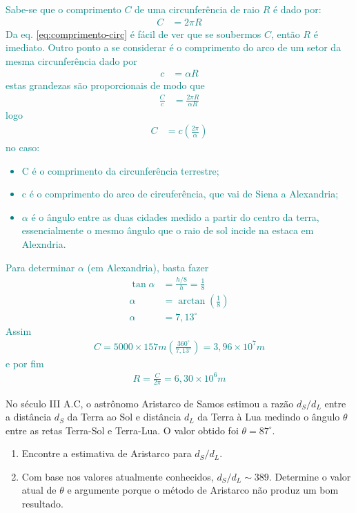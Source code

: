 \begin{sol}
	\textcolor{teal} {
		Sabe-se que o comprimento $C$ de uma circunferência de raio $R$ é dado por:
		\begin{align}
			C&=2\pi R
			\label{eq:comprimento-circ}
		\end{align}
		Da eq. \eqref{eq:comprimento-circ} é fácil de ver que se soubermos $C$, então $R$ é imediato. Outro ponto a se considerar é o comprimento do arco de um setor da mesma circunferência dado por
		\begin{align}
			c&=\alpha R
			\label{eq:comprimento-setor}
		\end{align}
		estas grandezas são proporcionais de modo que
		\begin{align}
			\frac{C}{c}&=\frac{2\pi R}{\alpha R}
		\end{align}
		logo
		\begin{align}
			C&=c\left(\frac{2\pi}{\alpha}\right)
		\end{align}
		no caso:
		\begin{itemize}
			\item C é o comprimento da circunferência terrestre;
			\item c é o comprimento do arco de circuferência, que vai de Siena a Alexandria;
			\item $\alpha$ é o ângulo entre as duas cidades medido a partir do centro da terra, essencialmente o mesmo ângulo que o raio de sol incide na estaca em Alexndria. 
		\end{itemize}
		Para determinar $\alpha$ (em Alexandria), basta fazer
		\begin{align}
			\tan \alpha&=\frac{h/8}{h}=\frac{1}{8} \nonumber \\
			\alpha&=\arctan\left(\frac{1}{8}\right) \nonumber \\
			\alpha&=7,13^{\circ}
		\end{align}
		Assim
		\begin{align}
			C=5000\times 157m\left(\frac{360^{\circ}}{7,13^{\circ}}\right)=3,96\times 10^{7}m
		\end{align}
		e por fim
		\begin{align}
			R=\frac{C}{2\pi}=6,30\times 10^{6}m
		\end{align}
	}
\end{sol}
\begin{prob}[ref: P05]
	No século III A.C, o astrônomo Aristarco de Samos estimou a razão $d_{S}/d_{L}$ entre a distância $d_{S}$ da Terra ao Sol e distância $d_{L}$ da Terra à Lua medindo o ângulo $\theta$ entre as retas Terra-Sol e Terra-Lua. O valor obtido foi $\theta=87^{\circ}$.
	\begin{enumerate}[label=\alph *)]
		\item Encontre a estimativa de Aristarco para $d_{S}/d_{L}$.
		\item Com base nos valores atualmente conhecidos, $d_{S}/d_{L}\sim 389$. Determine o valor atual de $\theta$ e argumente porque o método de Aristarco não produz um bom resultado.
	\end{enumerate}
\end{prob}


